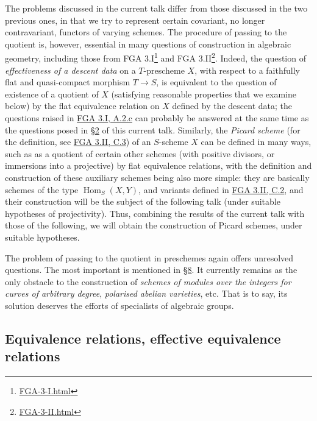 \documentclass{article}
\renewcommand{\href}[2]{#2\footnote{\url{#1}}}
\newcommand{\oldpage}[1]{\marginpar{\footnotesize$\Big\vert$ \textit{p.~#1}}}
\theoremstyle{definition}
\theoremstyle{definition}
\theoremstyle{definition}
\theoremstyle{definition}
\theoremstyle{remark}
\begin{document}
\oldpage{212-01}The problems discussed in the current talk differ from those discussed in the two previous ones, in that we try to represent certain covariant, no longer contravariant, functors of varying schemes.
The procedure of passing to the quotient is, however, essential in many questions of construction in algebraic geometry, including those from \href{FGA-3-I.html}{FGA 3.I} and \href{FGA-3-II.html}{FGA 3.II}.
Indeed, the question of \emph{effectiveness of a descent data} on a \(T\)-prescheme \(X\), with respect to a faithfully flat and quasi-compact morphism \(T\to S\), is equivalent to the question of existence of a quotient of \(X\) (satisfying reasonable properties that we examine below) by the flat equivalence relation on \(X\) defined by the descent data;
the questions raised in \protect\hyperlink{fga-3-i-section-A.2.c}{FGA 3.I, A.2.c} can probably be answered at the same time as the questions posed in \protect\hyperlink{fga-3-iii-section-2}{§2} of this current talk.
Similarly, the \emph{Picard scheme} (for the definition, see \protect\hyperlink{fga-3-ii-section-C.3}{FGA 3.II, C.3}) of an \(S\)-scheme \(X\) can be defined in many ways, such as as a quotient of certain other schemes (with positive divisors, or immersions into a projective) by flat equivalence relations, with the definition and construction of these auxiliary schemes being also more simple: they are basically schemes of the type \(\operatorname{Hom}_S(X,Y)\), and variants defined in \protect\hyperlink{fga-3-ii-section-C.2}{FGA 3.II, C.2}, and their construction will be the subject of the following talk (under suitable hypotheses of projectivity).
Thus, combining the results of the current talk with those of the following, we will obtain the construction of Picard schemes, under suitable hypotheses.

The problem of passing to the quotient in preschemes again offers unresolved questions.
The most important is mentioned in \protect\hyperlink{fga-3-iii-section-8}{§8}.
It currently remains as the only obstacle to the construction of \emph{schemes of modules over the integers for curves of arbitrary degree}, \emph{polarised abelian varieties}, etc.
That is to say, its solution deserves the efforts of specialists of algebraic groups.

\hypertarget{fga-3-iii-section-1}{%
\subsection{Equivalence relations, effective equivalence relations}\label{fga-3-iii-section-1}}
\end{document}
